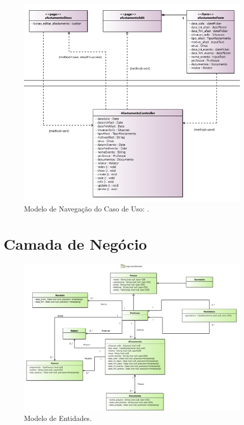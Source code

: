 \begin{figure}[h]
	\centering
	\includegraphics[width=1\textwidth]{figuras/figura-arquitetura-navegacao2.png}
	\caption{Modelo de Navegação do Caso de Uso: .}
	\label{figura-arquitetura-navegacao2}
\end{figure}

\section{Camada de Negócio}
\label{sec-arquitetura-negocio}


\begin{figure}[h]
	\centering
	\includegraphics[width=1\textwidth]{figuras/figura-arquitetura-entidade.png}
	\caption{Modelo de Entidades.}
	\label{figura-arquitetura-entidade}
\end{figure}

